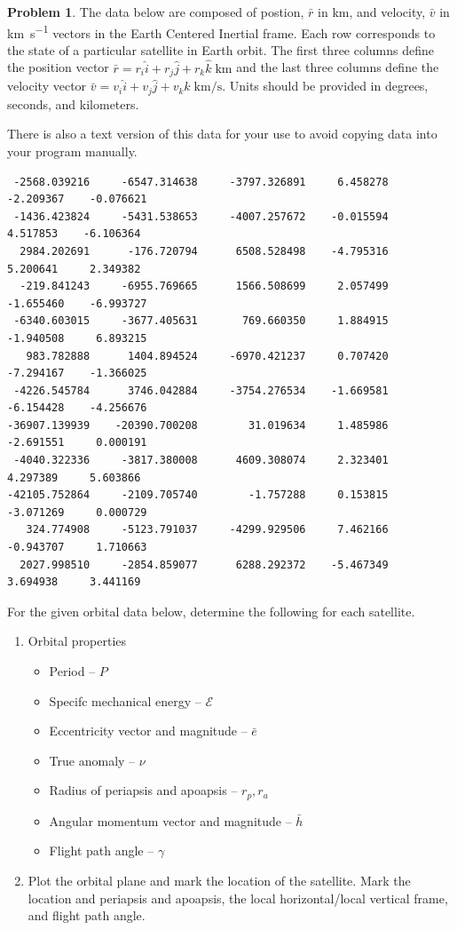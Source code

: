 \documentclass[10pt]{article}
\theoremstyle{definition}
\newtheorem{prob}{Problem}[section]
\newenvironment{subprob}%
{\renewcommand{\theenumi}{\alph{enumi}}\renewcommand{\labelenumi}{(\theenumi)}\begin{enumerate}}%
{\end{enumerate}}%
\begin{document}
\begin{prob}
    The data below are composed of postion, \( \bar r \) in \si{\kilo\meter}, and velocity, \( \bar v \) in \si{\kilo\meter\per\second} vectors in the Earth Centered Inertial frame. 
    Each row corresponds to the state of a particular satellite in Earth orbit. 
    The first three columns define the position vector \( \bar r = r_i \hat i + r_j \hat j + r_k \hat k \; \si{\kilo\meter} \) and the last three columns define the velocity vector \( \bar v = v_i \hat i + v_j \hat j + v_k \hat k \; \si{\kilo\meter\per\second} \).
Units should be provided in degrees, seconds, and kilometers.

There is also a text version of this data for your use to avoid copying data into your program manually. 
    \begin{verbatim}
 -2568.039216     -6547.314638     -3797.326891     6.458278    -2.209367    -0.076621
 -1436.423824     -5431.538653     -4007.257672    -0.015594     4.517853    -6.106364
  2984.202691      -176.720794      6508.528498    -4.795316     5.200641     2.349382
  -219.841243     -6955.769665      1566.508699     2.057499    -1.655460    -6.993727
 -6340.603015     -3677.405631       769.660350     1.884915    -1.940508     6.893215
   983.782888      1404.894524     -6970.421237     0.707420    -7.294167    -1.366025
 -4226.545784      3746.042884     -3754.276534    -1.669581    -6.154428    -4.256676
-36907.139939    -20390.700208        31.019634     1.485986    -2.691551     0.000191
 -4040.322336     -3817.380008      4609.308074     2.323401     4.297389     5.603866
-42105.752864     -2109.705740        -1.757288     0.153815    -3.071269     0.000729
   324.774908     -5123.791037     -4299.929506     7.462166    -0.943707     1.710663
  2027.998510     -2854.859077      6288.292372    -5.467349     3.694938     3.441169
    \end{verbatim}
    For the given orbital data below, determine the following for each satellite.

    \begin{subprob}
    \item Orbital properties
    \begin{itemize}
        \item Period -- \( P \) 
        \item Specifc mechanical energy -- \( \mathcal{E} \) 
        \item Eccentricity vector and magnitude -- \( \bar e\)
        \item True anomaly -- \( \nu \)
        \item Radius of periapsis and apoapsis -- \( r_p, r_a \)
        \item Angular momentum vector and magnitude -- \( \bar h \)
        \item Flight path angle -- \( \gamma \)
    \end{itemize}
\item Plot the orbital plane and mark the location of the satellite.
    Mark the location and periapsis and apoapsis, the local horizontal/local vertical frame, and flight path angle.
    \end{subprob}
\end{prob}
\end{document}
